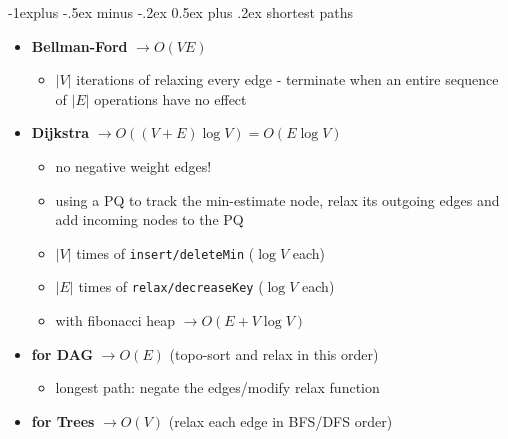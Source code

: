 \documentclass[10pt, landscape]{article}
\makeatletter
\renewcommand{\subsection}{\@startsection{subsection}{2}{0mm}%
                                {-1explus -.5ex minus -.2ex}%
                                {0.5ex plus .2ex}%
                                {\normalfont\normalsize\bfseries}}
\newcommand{\abs}[1]{\vert #1 \vert}
\let\then\rightarrow
\newcommand{\code}[1]{\textcolor{mygreen}{\texttt{#1}}}
\makeatother
\begin{document}
\begin{multicols}{4}
\subsection{shortest paths}
\begin{itemize}
    \item \textbf{Bellman-Ford} $\then O(VE)$
    \begin{itemize}
        \item $\abs{V}$ iterations of relaxing every edge - terminate when an entire sequence of $\abs{E}$ operations have no effect
    \end{itemize}
    \item \textbf{Dijkstra} $\then O((V+E)\log V) = O(E\log V)$
    \begin{itemize}
        \item no negative weight edges!
        \item using a PQ to track the min-estimate node, relax its outgoing edges and add incoming nodes to the PQ
        \item $\abs{V}$ times of \code{insert/deleteMin} ($\log V$ each)
        \item $\abs{E}$ times of \code{relax/decreaseKey} ($\log V$ each)
        \item with fibonacci heap $\then O(E + V \log V)$
    \end{itemize}
    \item \textbf{for DAG} $\then O(E)$ (topo-sort and relax in this order)
    \begin{itemize}
        \item longest path: negate the edges/modify relax function
    \end{itemize}
    \item \textbf{for Trees} $\then O(V)$ (relax each edge in BFS/DFS order)
\end{itemize}


\end{multicols}
\end{document}
